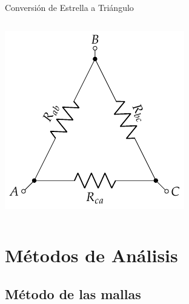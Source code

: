 \documentclass[aspectratio=169, usenames,svgnames,dvipsnames]{beamer}
\begin{document}
\begin{frame}[label={sec:org0504ca8}]{Conversión de Estrella a Triángulo}
\begin{columns}
\begin{column}{0.3\columnwidth}
\begin{center}
\includegraphics[width=.9\linewidth]{../figs/Conexion_Triangulo.pdf}
\end{center}
\end{column}
\end{columns}
\end{frame}
\section{Métodos de Análisis}
\label{sec:org0f4079d}

\subsection{Método de las mallas}
\label{sec:orgb8831ef}
\end{document}
